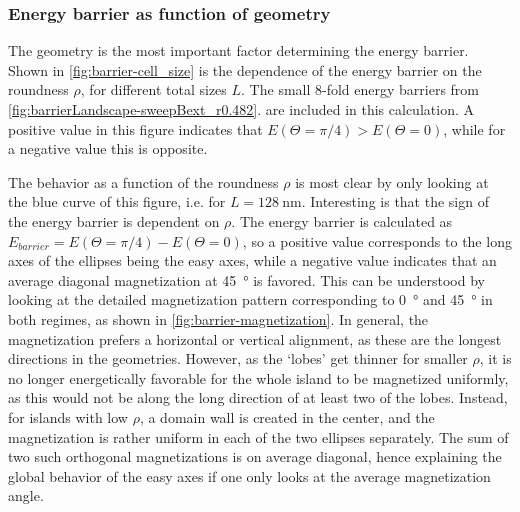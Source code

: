 \documentclass[11pt,a4paper,english]{article}
\begin{document}
\subsubsection{Energy barrier as function of geometry}
The geometry is the most important factor determining the energy barrier. Shown in \cref{fig:barrier-cell_size} is the dependence of the energy barrier on the roundness $\rho$, for different total sizes $L$. The small 8-fold energy barriers from \cref{fig:barrierLandscape-sweepBext_r0.482}.
are included in this calculation. A positive value in this figure indicates that $E(\Theta=\pi/4) > E(\Theta=0)$, while for a negative value this is opposite. \par %
The behavior as a function of the roundness $\rho$ is most clear by only looking at the blue curve of this figure, i.e. for $L=\SI{128}{\nano\metre}$. Interesting is that the sign of the energy barrier is dependent on $\rho$. The energy barrier is calculated as $E_{barrier} = E(\Theta=\pi/4) - E(\Theta=0)$, so a positive value corresponds to the long axes of the ellipses being the easy axes, while a negative value indicates that an average diagonal magnetization at \SI{45}{\degree} is favored. %
This can be understood by looking at the detailed magnetization pattern corresponding to \SI{0}{\degree} and \SI{45}{\degree} in both regimes, as shown in \cref{fig:barrier-magnetization}. In general, the magnetization prefers a horizontal or vertical alignment, as these are the longest directions in the geometries. However, as the `lobes' get thinner for smaller $\rho$, it is no longer energetically favorable for the whole island to be magnetized uniformly, as this would not be along the long direction of at least two of the lobes. Instead, for islands with low $\rho$, a domain wall is created in the center, and the magnetization is rather uniform in each of the two ellipses separately. The sum of two such orthogonal magnetizations is on average diagonal, hence explaining the global behavior of the easy axes if one only looks at the average magnetization angle.
\end{document}
